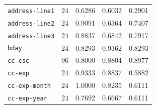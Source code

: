 \begin{longtable}{lrrrr}
\texttt{address-line1} & 24 & 0.6286 & 0.6032 & 0.2901 \\  %
\texttt{address-line2} & 24 & 0.9091 & 0.6364 & 0.7407 \\  %
\texttt{address-line3} & 24 & 0.8837 & 0.6842 & 0.7917 \\  %
\texttt{bday} & 24 & 0.8293 & 0.9362 & 0.8293 \\  %
\texttt{cc-csc} & 96 & 0.8000 & 0.8804 & 0.8977 \\  %
\texttt{cc-exp} & 24 & 0.9333 & 0.8837 & 0.5882 \\  %
\texttt{cc-exp-month} & 24 & 1.0000 & 0.8235 & 0.6111 \\  %
\texttt{cc-exp-year} & 24 & 0.7692 & 0.6667 & 0.6111 \\  %

\end{longtable}
